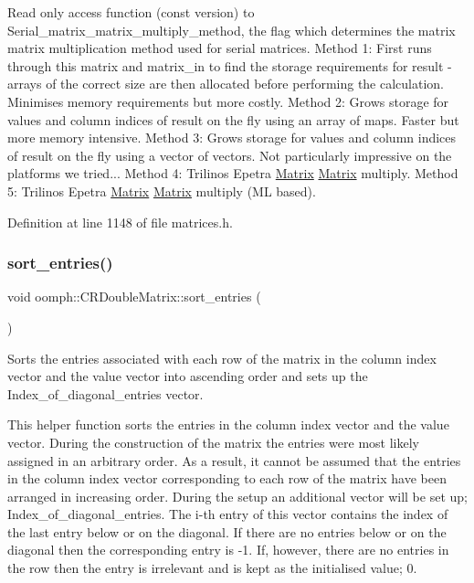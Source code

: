Read only access function (const version) to Serial\+\_\+matrix\+\_\+matrix\+\_\+multiply\+\_\+method, the flag which determines the matrix matrix multiplication method used for serial matrices. Method 1\+: First runs through this matrix and matrix\+\_\+in to find the storage requirements for result -\/ arrays of the correct size are then allocated before performing the calculation. Minimises memory requirements but more costly. Method 2\+: Grows storage for values and column indices of result \textquotesingle{}on the fly\textquotesingle{} using an array of maps. Faster but more memory intensive. Method 3\+: Grows storage for values and column indices of result \textquotesingle{}on the fly\textquotesingle{} using a vector of vectors. Not particularly impressive on the platforms we tried... Method 4\+: Trilinos Epetra \hyperlink{classoomph_1_1Matrix}{Matrix} \hyperlink{classoomph_1_1Matrix}{Matrix} multiply. Method 5\+: Trilinos Epetra \hyperlink{classoomph_1_1Matrix}{Matrix} \hyperlink{classoomph_1_1Matrix}{Matrix} multiply (ML based). 



Definition at line 1148 of file matrices.\+h.

\mbox{\label{classoomph_1_1CRDoubleMatrix_a2107875787d4dfa1cf007c05a041b078}} 
\subsubsection{\texorpdfstring{sort\+\_\+entries()}{sort\_entries()}}
{\footnotesize\ttfamily void oomph\+::\+C\+R\+Double\+Matrix\+::sort\+\_\+entries (\begin{DoxyParamCaption}{ }\end{DoxyParamCaption})}



Sorts the entries associated with each row of the matrix in the column index vector and the value vector into ascending order and sets up the Index\+\_\+of\+\_\+diagonal\+\_\+entries vector. 

This helper function sorts the entries in the column index vector and the value vector. During the construction of the matrix the entries were most likely assigned in an arbitrary order. As a result, it cannot be assumed that the entries in the column index vector corresponding to each row of the matrix have been arranged in increasing order. During the setup an additional vector will be set up; Index\+\_\+of\+\_\+diagonal\+\_\+entries. The i-\/th entry of this vector contains the index of the last entry below or on the diagonal. If there are no entries below or on the diagonal then the corresponding entry is -\/1. If, however, there are no entries in the row then the entry is irrelevant and is kept as the initialised value; 0. 

